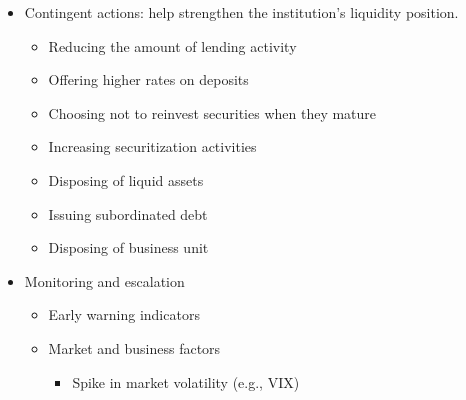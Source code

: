 \begin{itemize}
\item Contingent actions: help strengthen the institution's liquidity
position.
    \begin{itemize}
    \item Reducing the amount of lending activity
    \item  Offering higher rates on deposits
    \item Choosing not to reinvest securities when they mature
    \item Increasing securitization activities
    \item Disposing of liquid assets
    \item Issuing subordinated debt
    \item Disposing of business unit
    \end{itemize}
\item Monitoring and escalation
    \begin{itemize}
    \item Early warning indicators
    \item Market and business factors
        \begin{itemize}
        \item Spike in market volatility (e.g., VIX)
        \end{itemize}
        

\end{itemize}
\end{itemize}
